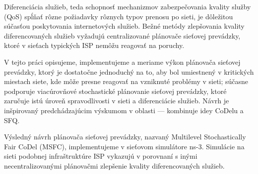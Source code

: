 Diferenciácia služieb, teda schopnosť mechanizmov zabezpečovania kvality služby (QoS) spĺňať rôzne požiadavky rôznych typov prenosu po sieti, je dôležitou súčasťou poskytovania internetových služieb. Bežné metódy zlepšovania kvality diferencovaných služieb vyžadujú centralizované plánovače sieťovej prevádzky, ktoré v sieťach typických ISP nemôžu reagovať na poruchy.

V tejto práci opisujeme, implementujeme a meriame výkon plánovača sieťovej prevádzky, ktorý je dostatočne jednoduchý na to, aby bol umiestnený v kritických miestach siete, kde môže presne reagovať na vzniknuté problémy v sieti; súčasne podporuje viacúrovňové stochastické plánovanie sieťovej prevádzky, ktoré zaručuje istú úroveň spravodlivosti v sieti a diferenciácie služieb. Návrh je inšpirovaný predchádzajúcim výskumom v oblasti --- kombinuje idey CoDelu a SFQ.

Výsledný návrh plánovača sieťovej prevádzky, nazvaný Multilevel Stochastically Fair CoDel (MSFC), implementujeme v sieťovom simulátore ns-3. Simulácie na sieti podobnej infraštruktúre ISP vykazujú v porovnaní s inými necentralizovanými plánovačmi zlepšenie kvality diferencovaných služieb.